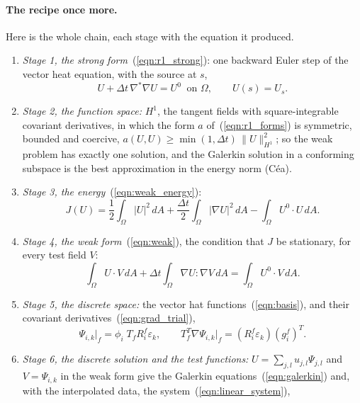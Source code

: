 \paragraph{The recipe once more.} Here is the whole chain, each stage with the equation it produced.
\begin{enumerate}
\item \emph{Stage 1, the strong form}~(\ref{eqn:r1_strong}): one backward Euler step of the vector heat equation, with the source at $s$,
\begin{equation*}
U + \Delta t\,\nabla^*\nabla U = U^0 \ \text{ on } \Omega, \qquad U(s) = U_s .
\end{equation*}
\item \emph{Stage 2, the function space:} $H^1$, the tangent fields with square-integrable covariant derivatives, in which the form $a$ of~(\ref{eqn:r1_forms}) is symmetric, bounded and coercive, $a(U, U) \geq \min(1, \Delta t)\, \|U\|_{H^1}^2$; so the weak problem has exactly one solution, and the Galerkin solution in a conforming subspace is the best approximation in the energy norm (C\'ea).
\item \emph{Stage 3, the energy}~(\ref{eqn:weak_energy}):
\begin{equation*}
J(U) = \frac12 \int_\Omega |U|^2\, dA + \frac{\Delta t}{2} \int_\Omega |\nabla U|^2\, dA - \int_\Omega U^0 \cdot U\, dA .
\end{equation*}
\item \emph{Stage 4, the weak form}~(\ref{eqn:weak}), the condition that $J$ be stationary, for every test field $V$:
\begin{equation*}
\int_\Omega U \cdot V\, dA + \Delta t \int_\Omega \nabla U : \nabla V\, dA = \int_\Omega U^0 \cdot V\, dA .
\end{equation*}
\item \emph{Stage 5, the discrete space:} the vector hat functions~(\ref{eqn:basis}), and their covariant derivatives~(\ref{eqn:grad_trial}),
\begin{equation*}
\Psi_{i,k}\big|_f = \phi_i\; T_f R_i^f \varepsilon_k, \qquad T_f^T\nabla\Psi_{i,k}\big|_f = (R_i^f\varepsilon_k)(g_i^f)^T .
\end{equation*}
\item \emph{Stage 6, the discrete solution and the test functions:} $U = \sum_{j,l} u_{j,l}\Psi_{j,l}$ and $V = \Psi_{i,k}$ in the weak form give the Galerkin equations~(\ref{eqn:galerkin}) and, with the interpolated data, the system~(\ref{eqn:linear_system}),
\begin{equation*}

\end{equation*}
\end{enumerate}
